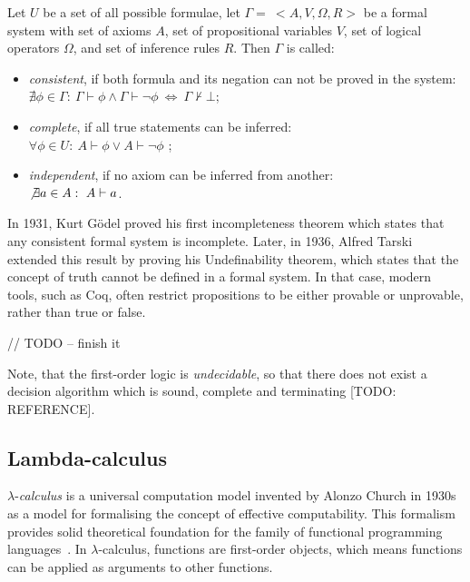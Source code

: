 \documentclass[article]{aaltoseries}
\begin{document}
Let $U$ be a set of all possible formulae, let $\Gamma = \ <A, V, \Omega, R>$ be a formal system with set of axioms $A$, set of propositional variables $V$, set of logical operators $\Omega$, and set of inference rules $R$. Then $\Gamma$ is called:
\begin{itemize}
	\itemsep0em
	\item \textit{consistent}, if both formula and its negation can not be proved in the system: \\
		$\nexists \phi \in \Gamma: \ \Gamma \vdash \phi \land \Gamma \vdash \neg \phi  \ \Leftrightarrow \ \Gamma \nvdash \bot$;
	\item \textit{complete}, if all true statements can be inferred: \\
		$\forall \phi \in U: \ A \vdash \phi \lor A \vdash \neg \phi$ ;
	\item \textit{independent}, if no axiom can be inferred from another: \\
		$\not \exists a \in A: \ A \vdash a$.
\end{itemize}

In 1931, Kurt Gödel proved his first incompleteness theorem which states that any consistent formal system is incomplete. Later, in 1936, Alfred Tarski extended this result by proving his Undefinability theorem, which states that the concept of truth cannot be defined in a formal system. %
In that case, modern tools, such as Coq, often restrict propositions to be either provable or unprovable, rather than true or false.


// TODO -- finish it


Note, that the first-order logic is \textit{undecidable}, so that there does not exist a decision algorithm which is sound, complete and terminating [TODO: REFERENCE]. %


\subsection{Lambda-calculus}

$\lambda$-\textit{calculus} is a universal computation model invented by Alonzo Church in 1930s as a model for formalising the concept of effective computability.  This formalism provides solid theoretical foundation for the family of functional programming languages~\cite{Roj15}. In $\lambda$-calculus, functions are first-order objects, which means functions can be applied as arguments to other functions.
\end{document}
